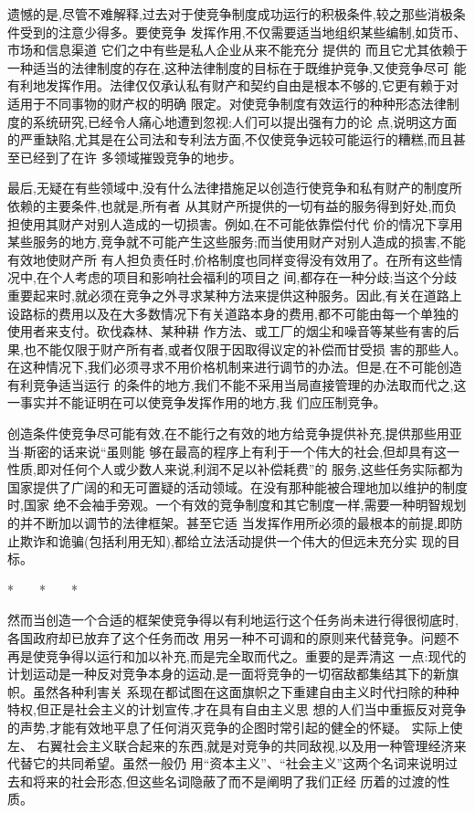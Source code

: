 ﻿\documentclass[12pt]{article}
\begin{document}
遗憾的是,尽管不难解释,过去对于使竞争制度成功运行的积极条件,较之那些消极条件受到的注意少得多。要使竞争
发挥作用,不仅需要适当地组织某些编制,如货币、市场和信息渠道 \myrule 它们之中有些是私人企业从来不能充分
提供的 \myrule 而且它尤其依赖于一种适当的法律制度的存在,这种法律制度的目标在于既维护竞争,又使竞争尽可
能有利地发挥作用。法律仅仅承认私有财产和契约自由是根本不够的,它更有赖于对适用于不同事物的财产权的明确
限定。对使竞争制度有效运行的种种形态法律制度的系统研究,已经令人痛心地遭到忽视;人们可以提出强有力的论
点,说明这方面的严重缺陷,尤其是在公司法和专利法方面,不仅使竞争远较可能运行的糟糕,而且甚至已经到了在许
多领域摧毁竞争的地步。

最后,无疑在有些领域中,没有什么法律措施足以创造行使竞争和私有财产的制度所依赖的主要条件,也就是,所有者
从其财产所提供的一切有益的服务得到好处,而负担使用其财产对别人造成的一切损害。例如,在不可能依靠偿付代
价的情况下享用某些服务的地方,竞争就不可能产生这些服务;而当使用财产对别人造成的损害,不能有效地使财产所
有人担负责任时,价格制度也同样变得没有效用了。在所有这些情况中,在个人考虑的项目和影响社会福利的项目之
间,都存在一种分歧;当这个分歧重要起来时,就必须在竞争之外寻求某种方法来提供这种服务。因此,有关在道路上
设路标的费用以及在大多数情况下有关道路本身的费用,都不可能由每一个单独的使用者来支付。砍伐森林、某种耕
作方法、或工厂的烟尘和噪音等某些有害的后果,也不能仅限于财产所有者,或者仅限于因取得议定的补偿而甘受损
害的那些人。在这种情况下,我们必须寻求不用价格机制来进行调节的办法。但是,在不可能创造有利竞争适当运行
的条件的地方,我们不能不采用当局直接管理的办法取而代之,这一事实并不能证明在可以使竞争发挥作用的地方,我
们应压制竞争。

创造条件使竞争尽可能有效,在不能行之有效的地方给竞争提供补充,提供那些用亚当$\cdot$斯密的话来说``虽则能
够在最高的程序上有利于一个伟大的社会,但却具有这一性质,即对任何个人或少数人来说,利润不足以补偿耗费''的
服务,这些任务实际都为国家提供了广阔的和无可置疑的活动领域。在没有那种能被合理地加以维护的制度时,国家
绝不会袖手旁观。一个有效的竞争制度和其它制度一样,需要一种明智规划的并不断加以调节的法律框架。甚至它适
当发挥作用所必须的最根本的前提,即防止欺诈和诡骗(包括利用无知),都给立法活动提供一个伟大的但远未充分实
现的目标。

*　　*　　*

然而当创造一个合适的框架使竞争得以有利地运行这个任务尚未进行得很彻底时,各国政府却已放弃了这个任务而改
用另一种不可调和的原则来代替竞争。问题不再是使竞争得以运行和加以补充,而是完全取而代之。重要的是弄清这
一点:现代的计划运动是一种反对竞争本身的运动,是一面将竞争的一切宿敌都集结其下的新旗帜。虽然各种利害关
系现在都试图在这面旗帜之下重建自由主义时代扫除的种种特权,但正是社会主义的计划宣传,才在具有自由主义思
想的人们当中重振反对竞争的声势,才能有效地平息了任何消灭竞争的企图时常引起的健全的怀疑。 实际上使左、
右翼社会主义联合起来的东西,就是对竞争的共同敌视,以及用一种管理经济来代替它的共同希望。虽然一般仍
用``资本主义''、``社会主义''这两个名词来说明过去和将来的社会形态,但这些名词隐蔽了而不是阐明了我们正经
历着的过渡的性质。
\end{document}
